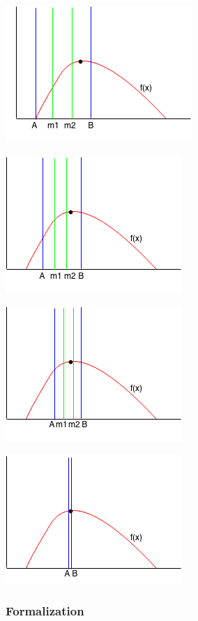 \documentclass[11pt,oneside]{book}
\makeatletter
\def\maxwidth#1{\ifdim\Gin@nat@width>#1 #1\else\Gin@nat@width\fi}
\makeatother
\begin{document}
\includegraphics[width=\maxwidth{\textwidth}]{ternarysearch4.png}

\includegraphics[width=\maxwidth{\textwidth}]{ternarysearch5.png}

\includegraphics[width=\maxwidth{\textwidth}]{ternarysearch6.png}

\includegraphics[width=\maxwidth{\textwidth}]{ternarysearch7.png}

\subsubsection{Formalization}
\end{document}
